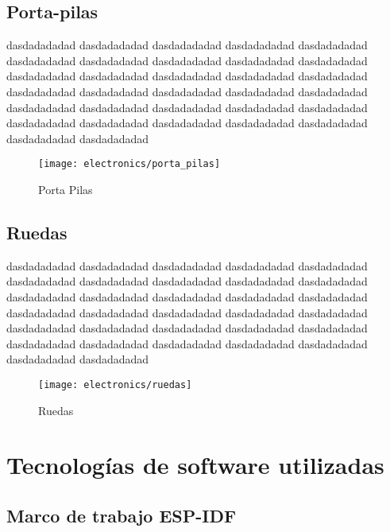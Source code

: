 \subsection{Porta-pilas}

dasdadadadad dasdadadadad dasdadadadad dasdadadadad dasdadadadad dasdadadadad dasdadadadad dasdadadadad dasdadadadad dasdadadadad dasdadadadad dasdadadadad dasdadadadad dasdadadadad dasdadadadad dasdadadadad dasdadadadad dasdadadadad dasdadadadad dasdadadadad dasdadadadad dasdadadadad dasdadadadad dasdadadadad dasdadadadad dasdadadadad dasdadadadad dasdadadadad dasdadadadad dasdadadadad dasdadadadad dasdadadadad

\begin{figure}[h]
    \centering
    \texttt{[image: electronics/porta\_pilas]}
    \caption{Porta Pilas}
    \label{fig:porta_pilas}
\end{figure}

\subsection{Ruedas}

dasdadadadad dasdadadadad dasdadadadad dasdadadadad dasdadadadad dasdadadadad dasdadadadad dasdadadadad dasdadadadad dasdadadadad dasdadadadad dasdadadadad dasdadadadad dasdadadadad dasdadadadad dasdadadadad dasdadadadad dasdadadadad dasdadadadad dasdadadadad dasdadadadad dasdadadadad dasdadadadad dasdadadadad dasdadadadad dasdadadadad dasdadadadad dasdadadadad dasdadadadad dasdadadadad dasdadadadad dasdadadadad


\begin{figure}[h]
    \centering
    \texttt{[image: electronics/ruedas]}
    \caption{Ruedas}
    \label{fig:ruedas}
\end{figure}

\section{Tecnologías de software utilizadas} 

\subsection{Marco de trabajo ESP-IDF}

